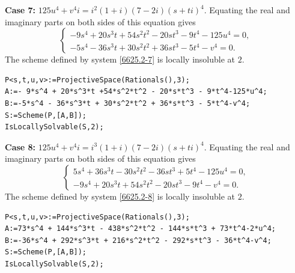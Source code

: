 \documentclass[a4paper,12pt,english,reqno]{amsart}
\begin{document}
{\bf Case 7:} $125u^4+v^4i=i^2(1+i)(7-2i)(s+ti)^4$. Equating the real and imaginary parts on both sides of this equation gives
\begin{equation}\label{6625.2-7}
\begin{cases}
-9s^4 + 20s^3t + 54s^2t^2 - 20st^3 - 9t^4 - 125u^4=0,\\
-5s^4 - 36s^3t + 30s^2t^2 + 36st^3 - 5t^4 - v^4=0.
\end{cases}
\end{equation}
The scheme defined by system \eqref{6625.2-7} is locally insoluble at $2$.

\begin{lstlisting}
P<s,t,u,v>:=ProjectiveSpace(Rationals(),3);
A:=- 9*s^4 + 20*s^3*t +54*s^2*t^2 - 20*s*t^3 - 9*t^4-125*u^4;
B:=-5*s^4 - 36*s^3*t + 30*s^2*t^2 + 36*s*t^3 - 5*t^4-v^4;
S:=Scheme(P,[A,B]);
IsLocallySolvable(S,2);
\end{lstlisting}


{\bf Case 8:} $125u^4+v^4i=i^3(1+i)(7-2i)(s+ti)^4$. Equating the real and imaginary parts on both sides of this equation gives
\begin{equation}\label{6625.2-8}
\begin{cases}
5s^4 + 36s^3t - 30s^2t^2 - 36st^3 + 5t^4 - 125u^4=0,\\
-9s^4 + 20s^3t + 54s^2t^2 - 20st^3 - 9t^4 - v^4=0.
\end{cases}
\end{equation}
The scheme defined by system \eqref{6625.2-8} is locally insoluble at $2$.

\begin{lstlisting}
P<s,t,u,v>:=ProjectiveSpace(Rationals(),3);
A:=73*s^4 + 144*s^3*t - 438*s^2*t^2 - 144*s*t^3 + 73*t^4-2*u^4;
B:=-36*s^4 + 292*s^3*t + 216*s^2*t^2 - 292*s*t^3 - 36*t^4-v^4;
S:=Scheme(P,[A,B]);
IsLocallySolvable(S,2);
\end{lstlisting}
\end{document}
